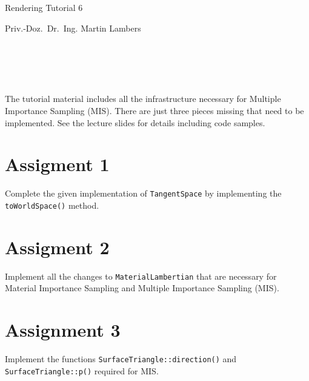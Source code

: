 \documentclass[a4paper,11pt]{article}
\newcommand{\authortitle}{Priv.-Doz.~Dr.~Ing.}
\newcommand{\authorname}{Martin Lambers}
\newcommand{\course}{Rendering}
\newcommand{\tutorial}{Tutorial 6}
\newcommand{\code}[1]{\texttt{#1}}
\begin{document}
\thispagestyle{empty}

\LARGE

\centerline{\course{} \tutorial}

\vspace{1ex}

\normalsize

\centerline{\authortitle{} \authorname}


\section*{~}

The tutorial material includes all the infrastructure necessary for Multiple
Importance Sampling (MIS). There are just three pieces missing that need to be
implemented. See the lecture slides for details including code samples.

\section*{Assigment 1}

Complete the given implementation of \code{TangentSpace} by implementing the
\code{toWorldSpace()} method.

\section*{Assigment 2}

Implement all the changes to \code{MaterialLambertian} that are necessary for
Material Importance Sampling and Multiple Importance Sampling (MIS). 

\section*{Assignment 3}

Implement the functions \code{SurfaceTriangle::direction()} and
\code{SurfaceTriangle::p()} required for MIS.
\end{document}
